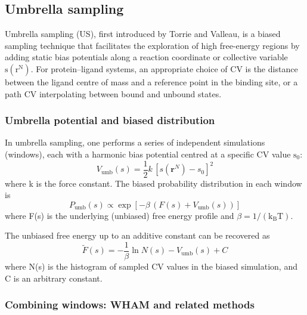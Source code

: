 \documentclass[12pt]{article}
\begin{document}
\subsection{Umbrella sampling}

Umbrella sampling (US), first introduced by Torrie and Valleau\cite{CH9_TorrieValleau1977}, is a biased sampling technique that facilitates the exploration of high free-energy regions by adding static bias potentials along a reaction coordinate or collective variable $\textrm{s}(\textrm{r}^\textrm{N})$. For protein--ligand systems, an appropriate choice of CV is the distance between the ligand centre of mass and a reference point in the binding site, or a path CV interpolating between bound and unbound states.

\subsubsection{Umbrella potential and biased distribution}

In umbrella sampling, one performs a series of independent simulations (windows), each with a harmonic bias potential centred at a specific CV value $\textrm{s}_\textrm{0}$:
\begin{equation}
V_{\text{umb}}(s) = \frac{1}{2}k\,[s(\mathbf{r}^N) - s_0]^2
\end{equation}
where k is the force constant\cite{CH9_Kastner2011}. The biased probability distribution in each window is
\begin{equation}
P_{\text{umb}}(s) \propto \exp\left[-\beta\,(F(s) + V_{\text{umb}}(s))\right]
\end{equation}
where F(s) is the underlying (unbiased) free energy profile and $\beta = 1/(\textrm{k}_{\textrm{B}}\textrm{T})$.

The unbiased free energy up to an additive constant can be recovered as
\begin{equation}
\tilde{F}(s) = -\frac{1}{\beta}\ln N(s) - V_{\text{umb}}(s) + C
\end{equation}
where N(s) is the histogram of sampled CV values in the biased simulation, and C is an arbitrary constant\cite{CH9_Kastner2011}.

\subsubsection{Combining windows: WHAM and related methods}
\end{document}
